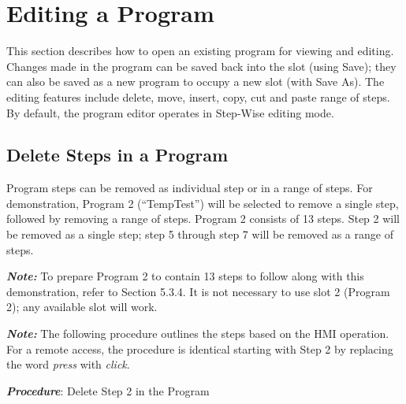 \section{Editing a Program}

This section describes how to open an existing program for viewing and
editing. Changes made in the program can be saved back into the slot
(using Save); they can also be saved as a new program to occupy a new
slot (with Save As). The editing features include delete, move, insert,
copy, cut and paste range of steps. By default, the program editor
operates in Step-Wise editing mode.


\subsection{Delete Steps in a
Program}

Program steps can be removed as individual step or in a range of steps.
For demonstration, Program 2 (``TempTest'') will be selected to remove a
single step, followed by removing a range of steps. Program 2 consists
of 13 steps. Step 2 will be removed as a single step; step 5 through
step 7 will be removed as a range of steps.

\textbf{\emph{Note:}} To prepare Program 2 to contain 13 steps to follow
along with this demonstration, refer to Section 5.3.4. It is not
necessary to use slot 2 (Program 2); any available slot will work.

\textbf{\emph{Note:}} The following procedure outlines the steps based
on the HMI operation. For a remote access, the procedure is identical
starting with Step 2 by replacing the word \emph{press} with
\emph{click}.

\textbf{\emph{Procedure}}: Delete Step 2 in the Program

